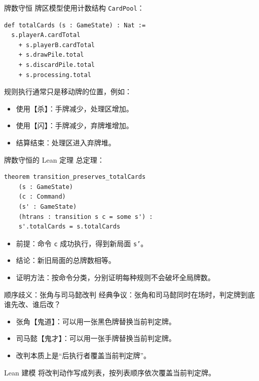 \documentclass[UTF8,aspectratio=169]{ctexbeamer}
\newcommand{\code}[1]{\texttt{#1}}
\begin{document}
\begin{frame}[fragile]{牌数守恒}
  牌区模型使用计数结构 \code{CardPool}：

  \begin{verbatim}
def totalCards (s : GameState) : Nat :=
  s.playerA.cardTotal
    + s.playerB.cardTotal
    + s.drawPile.total
    + s.discardPile.total
    + s.processing.total
  \end{verbatim}

  规则执行通常只是移动牌的位置，例如：

  \begin{itemize}
    \item 使用【杀】：手牌减少，处理区增加。
    \item 使用【闪】：手牌减少，弃牌堆增加。
    \item 结算结束：处理区进入弃牌堆。
  \end{itemize}
\end{frame}

\begin{frame}[fragile]{牌数守恒的 Lean 定理}
  总定理：

  \begin{verbatim}
theorem transition_preserves_totalCards
    (s : GameState)
    (c : Command)
    (s' : GameState)
    (htrans : transition s c = some s') :
    s'.totalCards = s.totalCards
  \end{verbatim}

  \begin{itemize}
    \item 前提：命令 \code{c} 成功执行，得到新局面 \code{s'}。
    \item 结论：新旧局面的总牌数相等。
    \item 证明方法：按命令分类，分别证明每种规则不会破坏全局牌数。
  \end{itemize}
\end{frame}

\begin{frame}{顺序歧义：张角与司马懿改判}
  经典争议：张角和司马懿同时在场时，判定牌到底谁先改、谁后改？

  \begin{itemize}
    \item 张角【鬼道】：可以用一张黑色牌替换当前判定牌。
    \item 司马懿【鬼才】：可以用一张手牌替换当前判定牌。
    \item 改判本质上是“后执行者覆盖当前判定牌”。
  \end{itemize}

  \begin{block}{Lean 建模}
    将改判动作写成列表，按列表顺序依次覆盖当前判定牌。
  \end{block}
\end{frame}
\end{document}
